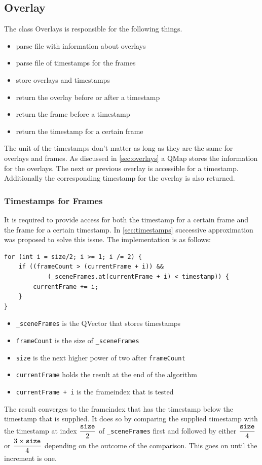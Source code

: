 \subsection{Overlay}
\label{sec:overlayClass}
The class Overlays is responsible for the following things.
\begin{itemize}
	\item parse file with information about overlays
	\item parse file of timestamps for the frames
	\item store overlays and timestamps
	\item return the overlay before or after a timestamp
	\item return the frame before a timestamp
	\item return the timestamp for a certain frame
\end{itemize}
The unit of the timestamps don't matter as long as they are the same for overlays and frames. 
As discussed in \ref{sec:overlays} a QMap stores the information for the overlays. The next or previous overlay is accessible for a timestamp. Additionally the corresponding timestamp for the overlay is also returned.
\subsubsection{Timestamps for Frames}
\label{sec:timestampsForFrames}
It is required to provide access for both the timestamp for a certain frame and the frame for a certain timestamp. In \ref{sec:timestamps} successive approximation was proposed to solve this issue. The implementation is as follows:

\begin{lstlisting}
for (int i = size/2; i >= 1; i /= 2) {
	if ((frameCount > (currentFrame + i)) &&
		    (_sceneFrames.at(currentFrame + i) < timestamp)) {
		currentFrame += i;
	}
}
\end{lstlisting}
\begin{itemize}
	\item \texttt{\_sceneFrames} is the QVector that stores timestamps
	\item \texttt{frameCount} is the size of \texttt{\_sceneFrames}
	\item \texttt{size} is the next higher power of two after \texttt{frameCount}
	\item \texttt{currentFrame} holds the result at the end of the algorithm
	\item \texttt{currentFrame +  i} is the frameindex that is tested
\end{itemize}
The result converges to the frameindex that has the timestamp below the timestamp that is supplied. It does so by comparing the supplied timestamp with the timestamp at index $\displaystyle\frac{\mbox{\texttt{size}}}{\mbox{2}}$ of \texttt{\_sceneFrames} first and followed by either $\displaystyle\frac{\mbox{\texttt{size}}}{\mbox{4}}$ or $\displaystyle\frac{\mbox{3 x \texttt{size}}}{\mbox{4}}$ depending on the outcome of the comparison. This goes on until the increment is one.

